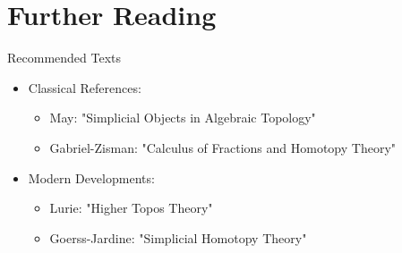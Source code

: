 \documentclass{beamer}
\begin{document}
\section{Further Reading}

\begin{frame}{Recommended Texts}
  \begin{itemize}
    \item Classical References:
      \begin{itemize}
        \item May: "Simplicial Objects in Algebraic Topology"
        \item Gabriel-Zisman: "Calculus of Fractions and Homotopy Theory"
      \end{itemize}
    \item Modern Developments:
      \begin{itemize}
        \item Lurie: "Higher Topos Theory"
        \item Goerss-Jardine: "Simplicial Homotopy Theory"
      \end{itemize}
  \end{itemize}
\end{frame}
\end{document}
